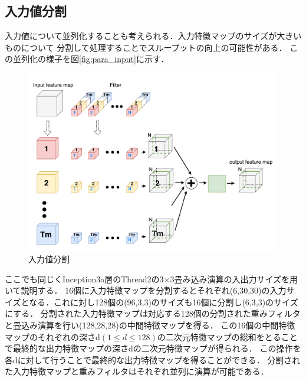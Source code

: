 {\subsection{入力値分割}
\label{subsec:para_input}
入力値について並列化することも考えられる．入力特徴マップのサイズが大きいものについて
分割して処理することでスループットの向上の可能性がある．
この並列化の様子を図\ref{fig:para_input}に示す．
\begin{figure}[h]
    \centering
    \includegraphics[width=12cm]{./chap5/fig/conv_para_input.pdf}
    \caption{入力値分割}
    \label{fig:conv_para_input}
\end{figure}
ここでも同じくInception3a層のThread2の3$\times$3畳み込み演算の入出力サイズを用いて説明する．
16個に入力特徴マップを分割するとそれぞれ(6,30,30)の入力サイズとなる．これに対し128個の(96,3,3)のサイズも16個に分割し(6,3,3)のサイズにする．
分割された入力特徴マップは対応する128個の分割された重みフィルタと畳込み演算を行い(128,28,28)の中間特徴マップを得る．
この16個の中間特徴マップのそれぞれの深さd$(1 \leq d \leq 128)$の二次元特徴マップの総和をとることで最終的な出力特徴マップの深さdの二次元特徴マップが得られる．
この操作を各dに対して行うことで最終的な出力特徴マップを得ることができる．
分割された入力特徴マップと重みフィルタはそれぞれ並列に演算が可能である．

}